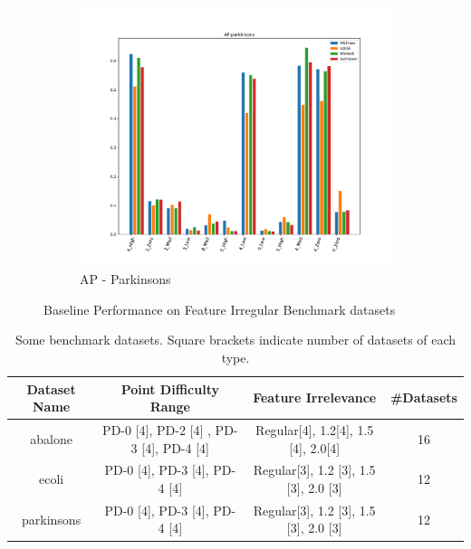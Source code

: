 \begin{figure}[ht!]
		\hfill
    \begin{subfigure}[t]{0.32\textwidth}
        \centering
        \includegraphics[width=\linewidth]{fig/baseline/AP_parkinsons.pdf}
        \caption{AP - Parkinsons}
    \end{subfigure}
		\hfill
    \caption{Baseline Performance on Feature Irregular Benchmark datasets}
\end{figure}

\begin{table}
\centering
\caption{Some benchmark datasets. Square brackets indicate number of datasets of each type.}
\label{table:benchmark}
\begin{tabular}{|c|c|c|c|}
\hline
\textbf{Dataset Name} & \textbf{Point Difficulty Range}                         & \textbf{Feature Irrelevance}                          & \textbf{\#Datasets} \\	\hline
abalone               & PD-0 {[}4{]}, PD-2 {[}4{]} , PD-3 {[}4{]}, PD-4 {[}4{]} & Regular{[}4{]}, 1.2{[}4{]}, 1.5 {[}4{]}, 2.0{[}4{]}   & 16                  \\	\hline
ecoli                 & PD-0 {[}4{]}, PD-3 {[}4{]}, PD-4 {[}4{]}                & Regular{[}3{]}, 1.2 {[}3{]}, 1.5 {[}3{]}, 2.0 {[}3{]} & 12                  \\	\hline
parkinsons            & PD-0 {[}4{]}, PD-3 {[}4{]}, PD-4 {[}4{]}                & Regular{[}3{]}, 1.2 {[}3{]}, 1.5 {[}3{]}, 2.0 {[}3{]} & 12                 \\	\hline
\end{tabular}
\end{table}

